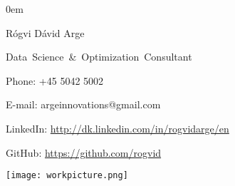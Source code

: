 \documentclass[10pt,a4paper]{article}
\begin{document}
\parindent0em
\begin{minipage}[t]{0.5\linewidth}
\vspace{-3.85cm}
{\Huge \textcolor{myblue}{Rógvi Dávid Arge} }\\
\vspace{-0.1cm}

{\Large \mbox{Data Science \& Optimization Consultant}}
\vspace{0.5cm}

Phone: +45 5042 5002

\vspace{0.1cm}
E-mail: argeinnovations@gmail.com

\vspace{0.1cm}
LinkedIn: \url{http://dk.linkedin.com/in/rogvidarge/en}

\vspace{0.1cm}
GitHub: \url{https://github.com/rogvid} \\
\vspace{-1.6cm}
\end{minipage}\hspace{0.1cm}
\hfill\begin{minipage}[t]{0.3\linewidth}\raggedleft
    \texttt{[image: workpicture.png]}
\end{minipage}
\end{document}
